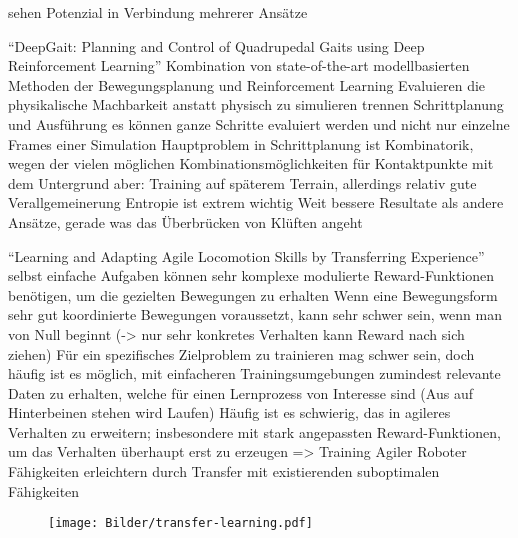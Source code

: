 sehen Potenzial in Verbindung mehrerer Ansätze
\cite{simmering2023walknet}



\enquote{DeepGait: Planning and Control of Quadrupedal Gaits using Deep Reinforcement Learning}
Kombination von state-of-the-art modellbasierten Methoden der Bewegungsplanung und Reinforcement Learning
Evaluieren die physikalische Machbarkeit anstatt physisch zu simulieren
trennen Schrittplanung und Ausführung
es können ganze Schritte evaluiert werden und nicht nur einzelne Frames einer Simulation
Hauptproblem in Schrittplanung ist Kombinatorik, wegen der vielen möglichen Kombinationsmöglichkeiten für Kontaktpunkte mit dem Untergrund
aber: Training auf späterem Terrain, allerdings relativ gute Verallgemeinerung
Entropie ist extrem wichtig
Weit bessere Resultate als andere Ansätze, gerade was das Überbrücken von Klüften angeht
\cite{tsounis2020deepgait}



\enquote{Learning and Adapting Agile Locomotion Skills by Transferring Experience}
selbst einfache Aufgaben können sehr komplexe modulierte Reward-Funktionen benötigen, um die gezielten Bewegungen zu erhalten
Wenn eine Bewegungsform sehr gut koordinierte Bewegungen voraussetzt, kann sehr schwer sein, wenn man von Null beginnt (-> nur sehr konkretes Verhalten kann Reward nach sich ziehen)
Für ein spezifisches Zielproblem zu trainieren mag schwer sein, doch häufig ist es möglich, mit einfacheren Trainingsumgebungen zumindest relevante Daten zu erhalten, welche für einen Lernprozess von Interesse sind
(Aus auf Hinterbeinen stehen wird Laufen)
Häufig ist es schwierig, das in agileres Verhalten zu erweitern; insbesondere mit stark angepassten Reward-Funktionen, um das Verhalten überhaupt erst zu erzeugen
=> Training Agiler Roboter Fähigkeiten erleichtern durch Transfer mit existierenden suboptimalen Fähigkeiten
\cite{smith2023learning}

\begin{figure}
    \centering
    \texttt{[image: Bilder/transfer-learning.pdf]}
    \caption{\cite{smith2023learning}}
\end{figure}